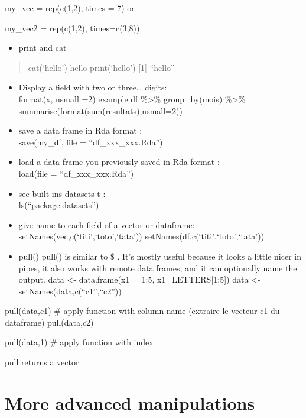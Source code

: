\documentclass[
]{book}
\providecommand{\tightlist}{%
  \setlength{\itemsep}{0pt}\setlength{\parskip}{0pt}}
\begin{document}
my\_vec = rep(c(1,2), times = 7)
or

my\_vec2 = rep(c(1,2), times=c(3,8))

\begin{itemize}
\tightlist
\item
  print and cat
\end{itemize}

\begin{quote}
cat(`hello')
hello
print(`hello')
{[}1{]} ``hello''
\end{quote}

\begin{itemize}
\item
  Display a field with two or three\ldots{} digits:\\
  format(x, nsmall =2)
  example
  df \%\textgreater\% group\_by(mois) \%\textgreater\% summarise(format(sum(resultats),nsmall=2))
\item
  save a data frame in Rda format :\\
  save(my\_df, file = ``df\_xxx\_xxx.Rda'')
\item
  load a data frame you previously saved in Rda format :\\
  load(file = ``df\_xxx\_xxx.Rda'')
\item
  see built-ins datasets t :\\
  ls(``package:datasets'')
\item
  give name to each field of a vector or dataframe:
  setNames(vec,c(`titi',`toto',`tata'))
  setNames(df,c(`titi',`toto',`tata'))
\item
  pull()
  pull() is similar to \$ . It's mostly useful because it looks a little nicer in pipes, it also works with remote data frames, and it can optionally name the output.
  data \textless- data.frame(x1 = 1:5, x1=LETTERS{[}1:5{]})
  data \textless- setNames(data,c(``c1'',``c2''))
\end{itemize}

pull(data,c1) \# apply function with column name (extraire le vecteur c1 du dataframe)
pull(data,c2)

pull(data,1) \# apply function with index

pull returns a vector

\hypertarget{more-advanced-manipulations}{%
\section{More advanced manipulations}\label{more-advanced-manipulations}}
\end{document}
